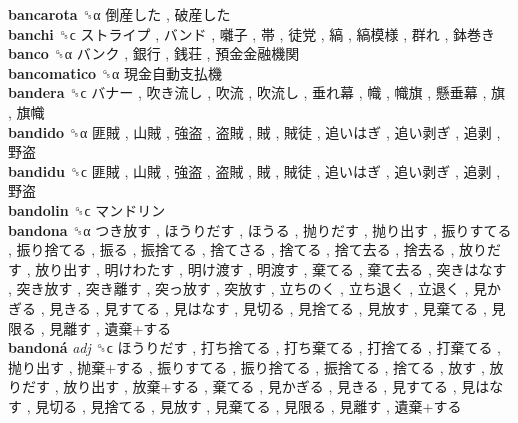 \textbf{bancarota} ␝α   倒産した ,  破産した   \\
\textbf{banchi} ␝ϲ   ストライプ ,  バンド ,  囃子 ,  帯 ,  徒党 ,  縞 ,  縞模様 ,  群れ ,  鉢巻き   \\
\textbf{banco} ␝α   バンク ,  銀行 ,  銭荘 ,  預金金融機関   \\
\textbf{bancomatico} ␝α   現金自動支払機   \\
\textbf{bandera} ␝ϲ   バナー ,  吹き流し ,  吹流 ,  吹流し ,  垂れ幕 ,  幟 ,  幟旗 ,  懸垂幕 ,  旗 ,  旗幟   \\
\textbf{bandido} ␝α   匪賊 ,  山賊 ,  強盗 ,  盗賊 ,  賊 ,  賊徒 ,  追いはぎ ,  追い剥ぎ ,  追剥 ,  野盗   \\
\textbf{bandidu} ␝ϲ   匪賊 ,  山賊 ,  強盗 ,  盗賊 ,  賊 ,  賊徒 ,  追いはぎ ,  追い剥ぎ ,  追剥 ,  野盗   \\
\textbf{bandolin} ␝ϲ   マンドリン   \\
\textbf{bandona} ␝α   つき放す ,  ほうりだす ,  ほうる ,  抛りだす ,  抛り出す ,  振りすてる ,  振り捨てる ,  振る ,  振捨てる ,  捨てさる ,  捨てる ,  捨て去る ,  捨去る ,  放りだす ,  放り出す ,  明けわたす ,  明け渡す ,  明渡す ,  棄てる ,  棄て去る ,  突きはなす ,  突き放す ,  突き離す ,  突っ放す ,  突放す ,  立ちのく ,  立ち退く ,  立退く ,  見かぎる ,  見きる ,  見すてる ,  見はなす ,  見切る ,  見捨てる ,  見放す ,  見棄てる ,  見限る ,  見離す ,  遺棄+する   \\
\textbf{bandoná} \emph{adj}  ␝ϲ   ほうりだす ,  打ち捨てる ,  打ち棄てる ,  打捨てる ,  打棄てる ,  抛り出す ,  抛棄+する ,  振りすてる ,  振り捨てる ,  振捨てる ,  捨てる ,  放す ,  放りだす ,  放り出す ,  放棄+する ,  棄てる ,  見かぎる ,  見きる ,  見すてる ,  見はなす ,  見切る ,  見捨てる ,  見放す ,  見棄てる ,  見限る ,  見離す ,  遺棄+する   \\
